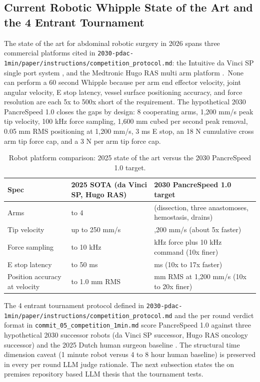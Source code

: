\clearpage

\subsection{Current Robotic Whipple State of the Art and the 4 Entrant Tournament}
\label{sec:intro-baseline}

The state of the art for abdominal robotic surgery in 2026 spans
three commercial platforms cited in
\texttt{2030-pdac-1min/paper/instructions/competition_protocol.md}:
the Intuitive da Vinci SP single port system
\cite{intuitive-davinci-sp}, and the Medtronic Hugo RAS multi arm
platform \cite{medtronic-hugo-ras}.\ None can perform a 60
second Whipple because per arm end effector velocity, joint
angular velocity, E stop latency, vessel surface positioning
accuracy, and force resolution are each 5x to 500x short of the
requirement. The hypothetical 2030 PancreSpeed 1.0 closes the
gaps by design: 8 cooperating arms, 1,200 mm/s peak tip velocity,
100 kHz force sampling, 1,600 mm cubed per second peak removal,
0.05 mm RMS positioning at 1,200 mm/s, 3 ms E stop, an 18 N
cumulative cross arm tip force cap, and a 3 N per arm tip force
cap.

\begin{table}[H]
\caption{Robot platform comparison: 2025 state of the art versus the 2030 PancreSpeed 1.0 target.}
\label{tab:robot-comparison}
\centering
\begin{tabular}{>{\raggedright\arraybackslash}p{3.7cm} >{\raggedright\arraybackslash}p{4.7cm} >{\raggedright\arraybackslash}p{6.8cm}}
\toprule
\textbf{Spec} & \textbf{2025 SOTA (da Vinci SP, Hugo RAS)} & \textbf{2030 PancreSpeed 1.0 target} \\
\midrule
  Arms & 1 to 4 \cite{intuitive-davinci-sp, medtronic-hugo-ras} & 8 (dissection, three anastomoses, hemostasis, drains) \\
  Tip velocity & up to 250 mm/s & 1,200 mm/s (about 5x faster) \\
  Force sampling & 1 to 10 kHz & 100 kHz force plus 10 kHz command (10x finer) \\
  E stop latency & 30 to 50 ms & 3 ms (10x to 17x faster) \\
  Position accuracy at velocity & 0.5 to 1.0 mm RMS & 0.05 mm RMS at 1,200 mm/s (10x to 20x finer) \\
\bottomrule
\end{tabular}
\end{table}

The 4 entrant tournament protocol defined in
\texttt{2030-pdac-1min/paper/instructions/competition_protocol.md}
and the per round verdict format in
\texttt{commit_05_competition_1min.md} score PancreSpeed 1.0
against three hypothetical 2030 successor robots (da Vinci SP
successor, Hugo RAS oncology successor)
and the 2025 Dutch human surgeon baseline
\cite{DutchCohort2025Whipple}. The structural time dimension
caveat (1 minute robot versus 4 to 8 hour human baseline) is
preserved in every per round LLM judge rationale. The next
subsection states the on premises repository based LLM thesis
that the tournament tests.

